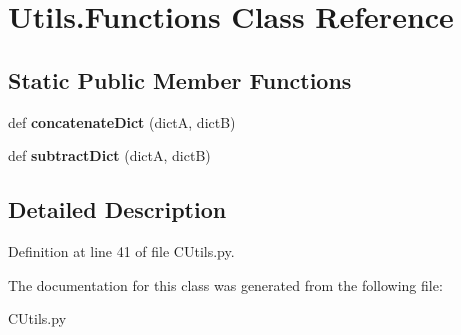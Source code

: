 \hypertarget{class_c_utils_1_1_utils_1_1_functions}{}\section{Utils.\+Functions Class Reference}
\label{class_c_utils_1_1_utils_1_1_functions}
\subsection*{Static Public Member Functions}
\begin{DoxyCompactItemize}
\item 
\mbox{\label{class_c_utils_1_1_utils_1_1_functions_a5e350b170a2f7c2a1bc0340e3d9dabe6}} 
def {\bfseries concatenate\+Dict} (dictA, dictB)
\item 
\mbox{\label{class_c_utils_1_1_utils_1_1_functions_a61ed8a6fa4067a6b22375e20bce00a1a}} 
def {\bfseries subtract\+Dict} (dictA, dictB)
\end{DoxyCompactItemize}


\subsection{Detailed Description}


Definition at line 41 of file C\+Utils.\+py.



The documentation for this class was generated from the following file\+:\begin{DoxyCompactItemize}
\item 
C\+Utils.\+py\end{DoxyCompactItemize}
